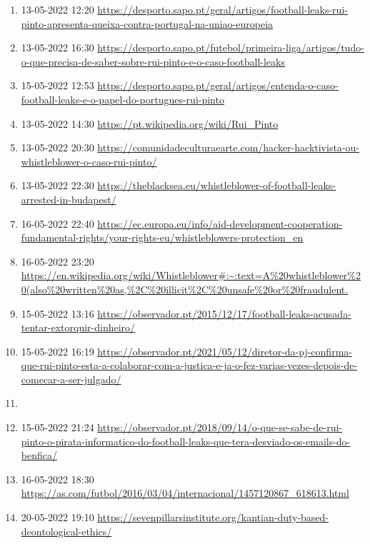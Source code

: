 

\begin{enumerate}
    \item \label{bib:sapo:queixa}
    13-05-2022 12:20 \url{https://desporto.sapo.pt/geral/artigos/football-leaks-rui-pinto-apresenta-queixa-contra-portugal-na-uniao-europeia}
    \item \label{bib:sapo:geral1}
    13-05-2022 16:30 \url{https://desporto.sapo.pt/futebol/primeira-liga/artigos/tudo-o-que-precisa-de-saber-sobre-rui-pinto-e-o-caso-football-leaks}
    \item \label{bib:sapo:geral2}
    15-05-2022 12:53 \url{https://desporto.sapo.pt/geral/artigos/entenda-o-caso-football-leaks-e-o-papel-do-portugues-rui-pinto}
    
    \item \label{bib:wiki}
    13-05-2022 14:30 \url{https://pt.wikipedia.org/wiki/Rui_Pinto}
    \item \label{bib:comunidadeculturaearte}
    13-05-2022 20:30 \url{https://comunidadeculturaearte.com/hacker-hacktivista-ou-whistleblower-o-caso-rui-pinto/}
    \item \label{bib:theblacksea}
    13-05-2022 22:30 \url{https://theblacksea.eu/whistleblower-of-football-leaks-arrested-in-budapest/}
    \item \label{bib:whistleblowers-protection_en}
    16-05-2022 22:40 \url{https://ec.europa.eu/info/aid-development-cooperation-fundamental-rights/your-rights-eu/whistleblowers-protection_en}
    \item \label{bib:wiki:whistleblower}
    16-05-2022 23:20 \url{https://en.wikipedia.org/wiki/Whistleblower#:~:text=A%20whistleblower%20(also%20written%20as,%2C%20illicit%2C%20unsafe%20or%20fraudulent.}
    
    \item \label{bib:observador:extorsao}
    15-05-2022 13:16 \url{https://observador.pt/2015/12/17/football-leaks-acusada-tentar-extorquir-dinheiro/}
    \item \label{bib:observador:colaborar}
    15-05-2022 16:19 \url{https://observador.pt/2021/05/12/diretor-da-pj-confirma-que-rui-pinto-esta-a-colaborar-com-a-justica-e-ja-o-fez-varias-vezes-depois-de-comecar-a-ser-julgado/}    \item \label{bib:diretorpj}
    \item \label{bib:observador:emails}
    15-05-2022 21:24 \url{https://observador.pt/2018/09/14/o-que-se-sabe-de-rui-pinto-o-pirata-informatico-do-football-leaks-que-tera-desviado-os-emails-do-benfica/}
    
    \item \label{bib:as}
    16-05-2022 18:30 \url{https://as.com/futbol/2016/03/04/internacional/1457120867_618613.html}
    \item \label{bib:kant}
    20-05-2022 19:10 \url{https://sevenpillarsinstitute.org/kantian-duty-based-deontological-ethics/}
\end{enumerate}


